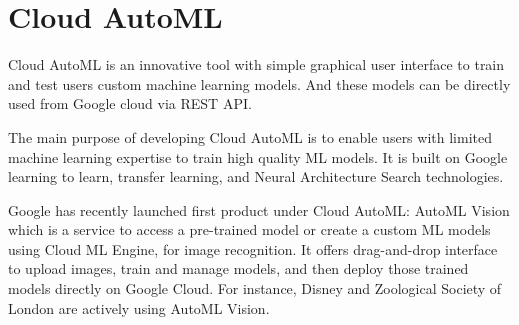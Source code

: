 \section{Cloud AutoML}

Cloud AutoML is an innovative tool with simple graphical user interface to train
and test users custom machine learning models. And these models can be directly
used from Google cloud via REST API. \cite{hid-sp18-602-cloudautoml-main} 

The main purpose of developing Cloud AutoML is to enable users with limited 
machine learning expertise to train high quality ML models. It is built on Google
learning to learn, transfer learning, and Neural Architecture Search 
technologies.

Google has recently launched first product under Cloud AutoML: AutoML Vision 
which is a service to access a pre-trained model or create a custom ML models using
Cloud ML Engine, for image recognition. It offers drag-and-drop interface to 
upload images, train and manage models, and then deploy those trained models 
directly on Google Cloud. For instance, Disney and Zoological Society of London are
actively using AutoML Vision.  \cite{hid-sp18-602-cloudautoml-blog} 

